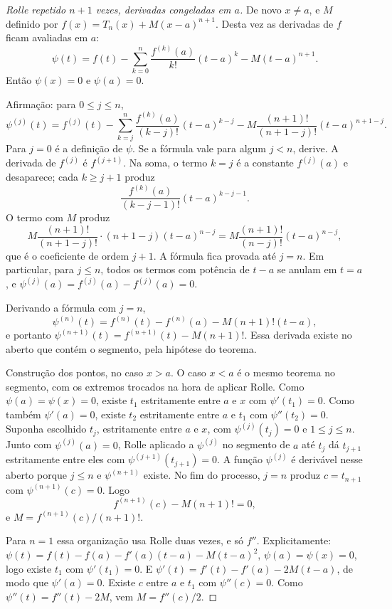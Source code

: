 \documentclass[11pt,a4paper]{article}
\begin{document}
\begin{proof}[Rolle repetido \(n+1\) vezes, derivadas congeladas em \(a\)]
De novo \(x\neq a\), e \(M\) definido por \(f(x)=T_n(x)+M(x-a)^{n+1}\). Desta vez as derivadas de \(f\) ficam avaliadas em \(a\):
\[
\psi(t)=f(t)-\sum_{k=0}^n\frac{f^{(k)}(a)}{k!}(t-a)^k-M(t-a)^{n+1}.
\]
Então \(\psi(x)=0\) e \(\psi(a)=0\).

Afirmação: para \(0\le j\le n\),
\begin{equation}
\label{eq:psi-j}
\psi^{(j)}(t)
=f^{(j)}(t)-\sum_{k=j}^n\frac{f^{(k)}(a)}{(k-j)!}(t-a)^{k-j}
-M\frac{(n+1)!}{(n+1-j)!}(t-a)^{n+1-j}.
\end{equation}
Para \(j=0\) é a definição de \(\psi\). Se a fórmula vale para algum \(j<n\), derive. A derivada de \(f^{(j)}\) é \(f^{(j+1)}\). Na soma, o termo \(k=j\) é a constante \(f^{(j)}(a)\) e desaparece; cada \(k\ge j+1\) produz
\[
\frac{f^{(k)}(a)}{(k-j-1)!}(t-a)^{k-j-1}.
\]
O termo com \(M\) produz
\[
M\frac{(n+1)!}{(n+1-j)!}\cdot(n+1-j)(t-a)^{n-j}
=M\frac{(n+1)!}{(n-j)!}(t-a)^{n-j},
\]
que é o coeficiente de ordem \(j+1\). A fórmula fica provada até \(j=n\). Em particular, para \(j\le n\), todos os termos com potência de \(t-a\) se anulam em \(t=a\), e \(\psi^{(j)}(a)=f^{(j)}(a)-f^{(j)}(a)=0\).

Derivando a fórmula com \(j=n\),
\[
\psi^{(n)}(t)=f^{(n)}(t)-f^{(n)}(a)-M(n+1)!(t-a),
\]
e portanto \(\psi^{(n+1)}(t)=f^{(n+1)}(t)-M(n+1)!\). Essa derivada existe no aberto que contém o segmento, pela hipótese do teorema.

Construção dos pontos, no caso \(x>a\). O caso \(x<a\) é o mesmo teorema no segmento, com os extremos trocados na hora de aplicar Rolle. Como \(\psi(a)=\psi(x)=0\), existe \(t_1\) estritamente entre \(a\) e \(x\) com \(\psi'(t_1)=0\). Como também \(\psi'(a)=0\), existe \(t_2\) estritamente entre \(a\) e \(t_1\) com \(\psi''(t_2)=0\). Suponha escolhido \(t_j\), estritamente entre \(a\) e \(x\), com \(\psi^{(j)}(t_j)=0\) e \(1\le j\le n\). Junto com \(\psi^{(j)}(a)=0\), Rolle aplicado a \(\psi^{(j)}\) no segmento de \(a\) até \(t_j\) dá \(t_{j+1}\) estritamente entre eles com \(\psi^{(j+1)}(t_{j+1})=0\). A função \(\psi^{(j)}\) é derivável nesse aberto porque \(j\le n\) e \(\psi^{(n+1)}\) existe. No fim do processo, \(j=n\) produz \(c=t_{n+1}\) com \(\psi^{(n+1)}(c)=0\). Logo
\[
f^{(n+1)}(c)-M(n+1)!=0,
\]
e \(M=f^{(n+1)}(c)/(n+1)!\).

Para \(n=1\) essa organização usa Rolle duas vezes, e só \(f''\). Explicitamente: \(\psi(t)=f(t)-f(a)-f'(a)(t-a)-M(t-a)^2\), \(\psi(a)=\psi(x)=0\), logo existe \(t_1\) com \(\psi'(t_1)=0\). E \(\psi'(t)=f'(t)-f'(a)-2M(t-a)\), de modo que \(\psi'(a)=0\). Existe \(c\) entre \(a\) e \(t_1\) com \(\psi''(c)=0\). Como \(\psi''(t)=f''(t)-2M\), vem \(M=f''(c)/2\).
\end{proof}
\end{document}
